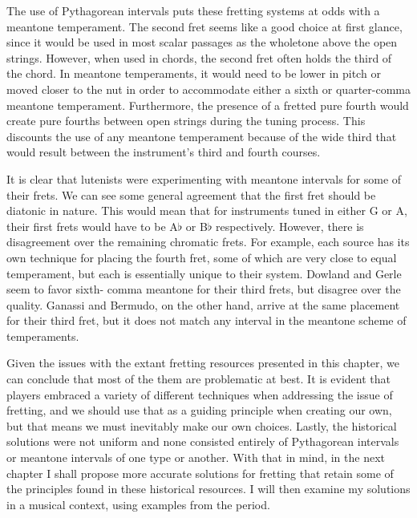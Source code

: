 The use of Pythagorean intervals puts these fretting systems at odds with a meantone temperament. The second fret seems
like a good choice at first glance, since it would be used in most scalar passages as the wholetone above the open
strings. However, when used in chords, the second fret often holds the third of the chord. In meantone temperaments, it
would need to be lower in pitch or moved closer to the nut in order to accommodate either a sixth or quarter-comma
meantone temperament. Furthermore, the presence of a fretted pure fourth would create pure fourths between open strings
during the tuning process. This discounts the use of any meantone temperament because of the wide third that would
result between the instrument's third and fourth courses.

It is clear that lutenists were experimenting with meantone intervals for some of their frets.  We can see some general
agreement that the first fret should be diatonic in nature. This would mean that for instruments tuned in either G or
A, their first frets would have to be A$\flat$ or B$\flat$ respectively. However, there is disagreement over the
remaining chromatic frets. For example, each source has its own technique for placing the fourth fret, some of which are
very close to equal temperament, but each is essentially unique to their system. Dowland and Gerle seem to favor sixth-
comma meantone for their third frets, but disagree over the quality. Ganassi and Bermudo, on the other hand, arrive at
the same placement for their third fret, but it does not match any interval in the meantone scheme of temperaments.

Given the issues with the extant fretting resources presented in this chapter, we can conclude that most of the them are
problematic at best. It is evident that players embraced a variety of different techniques when addressing the issue of
fretting, and we should use that as a guiding principle when creating our own, but that means we must inevitably make
our own choices. Lastly, the historical solutions were not uniform and none consisted entirely of Pythagorean intervals
or meantone intervals of one type or another. With that in mind, in the next chapter I shall propose more accurate
solutions for fretting that retain some of the principles found in these historical resources. I will then examine my
solutions in a musical context, using examples from the period.

